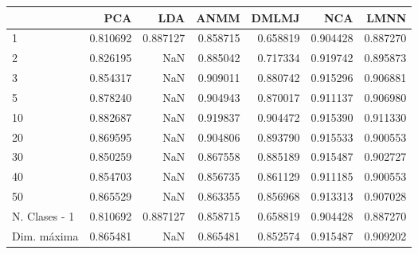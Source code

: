 \begin{tabular}{lrrrrrr}
\toprule
{} &       PCA &       LDA &      ANMM &     DMLMJ &       NCA &      LMNN \\
\midrule
1             &  0.810692 &  0.887127 &  0.858715 &  0.658819 &  0.904428 &  0.887270 \\
2             &  0.826195 &       NaN &  0.885042 &  0.717334 &  0.919742 &  0.895873 \\
3             &  0.854317 &       NaN &  0.909011 &  0.880742 &  0.915296 &  0.906881 \\
5             &  0.878240 &       NaN &  0.904943 &  0.870017 &  0.911137 &  0.906980 \\
10            &  0.882687 &       NaN &  0.919837 &  0.904472 &  0.915390 &  0.911330 \\
20            &  0.869595 &       NaN &  0.904806 &  0.893790 &  0.915533 &  0.900553 \\
30            &  0.850259 &       NaN &  0.867558 &  0.885189 &  0.915487 &  0.902727 \\
40            &  0.854703 &       NaN &  0.856735 &  0.861129 &  0.911185 &  0.900553 \\
50            &  0.865529 &       NaN &  0.863355 &  0.856968 &  0.913313 &  0.907028 \\
N. Clases - 1 &  0.810692 &  0.887127 &  0.858715 &  0.658819 &  0.904428 &  0.887270 \\
Dim. máxima   &  0.865481 &       NaN &  0.865481 &  0.852574 &  0.915487 &  0.909202 \\
\bottomrule
\end{tabular}
